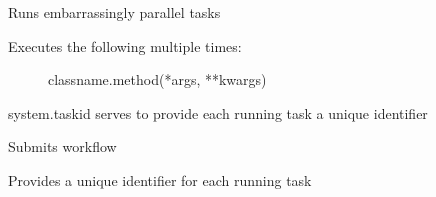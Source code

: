 \documentclass[letterpaper,10pt,english]{sphinxmanual}
\begin{document}
\begin{fulllineitems}
\begin{fulllineitems}
\end{fulllineitems}


\begin{fulllineitems}
\label{\detokenize{ref/seisflows.system:seisflows.system.pbs_sm.pbs_lg.run}}
Runs embarrassingly parallel tasks
\begin{description}
\item[{Executes the following multiple times:}] \leavevmode
classname.method(*args, **kwargs)

\end{description}

system.taskid serves to provide each running task a unique identifier

\end{fulllineitems}


\begin{fulllineitems}
\label{\detokenize{ref/seisflows.system:seisflows.system.pbs_sm.pbs_lg.save_kwargs}}
\end{fulllineitems}


\begin{fulllineitems}
\label{\detokenize{ref/seisflows.system:seisflows.system.pbs_sm.pbs_lg.submit}}
Submits workflow

\end{fulllineitems}


\begin{fulllineitems}
\label{\detokenize{ref/seisflows.system:seisflows.system.pbs_sm.pbs_lg.taskid}}
Provides a unique identifier for each running task

\end{fulllineitems}


\end{fulllineitems}
\end{document}
